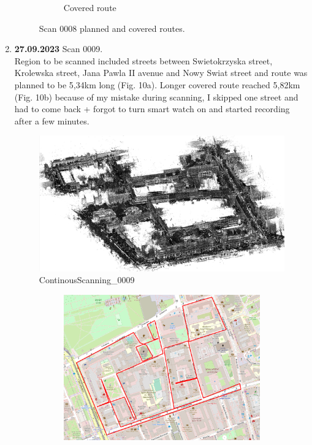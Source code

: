 \documentclass[a4paper,12pt]{book}
\begin{document}
\begin{enumerate}
\begin{figure}[H]
\begin{subfigure}{.83\textwidth}
			\caption{Covered route}
			\label{fig:b8}
		\end{subfigure}
		\caption{Scan 0008 planned and covered routes.}
		\label{fig:fig8}
	\end{figure} 
	\item \textbf{27.09.2023} Scan 0009. \\
	Region to be scanned included streets between Swietokrzyska street, Krolewska street, Jana Pawla II avenue and Nowy Swiat street and route was planned to be 5,34km long (Fig. 10a). Longer covered route reached 5,82km (Fig. 10b) because of my mistake during scanning, I skipped one street and had to come back + forgot to turn smart watch on and started recording after a few minutes.
	\begin{figure}[H]
		\includegraphics[width=1\linewidth]{cloud9}
		\caption{ContinousScanning\_0009}
	\end{figure}
	\begin{figure}[H]
		\centering
		\begin{subfigure}{.93\textwidth}
			\centering
			\includegraphics[width=1\linewidth]{route_p9}

\end{subfigure}
\end{figure}
\end{enumerate}
\end{document}
